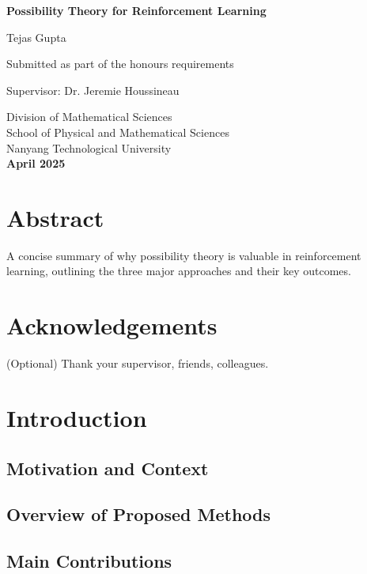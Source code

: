 \documentclass[12pt,a4paper]{report}
\begin{document}
\begin{titlepage}
    \centering
    \vspace*{3cm}
    {\Huge\bfseries Possibility Theory for Reinforcement Learning \par}
    \vspace{2cm}
    {\Large Tejas Gupta \par}
    \vspace{1.5cm}
    Submitted as part of the honours requirements \par
    \vspace{1cm}
    Supervisor: Dr. Jeremie Houssineau \par
    \vfill
    Division of Mathematical Sciences \\
    School of Physical and Mathematical Sciences \\
    Nanyang Technological University \\
    \vspace{1cm}
    \textbf{April 2025}
\end{titlepage}

\chapter*{Abstract}
A concise summary of why possibility theory is valuable in reinforcement learning, outlining the three major approaches and their key outcomes.

\chapter*{Acknowledgements}
(Optional) Thank your supervisor, friends, colleagues.

\tableofcontents

\chapter{Introduction}
\section{Motivation and Context}
\section{Overview of Proposed Methods}
\section{Main Contributions}
\end{document}
